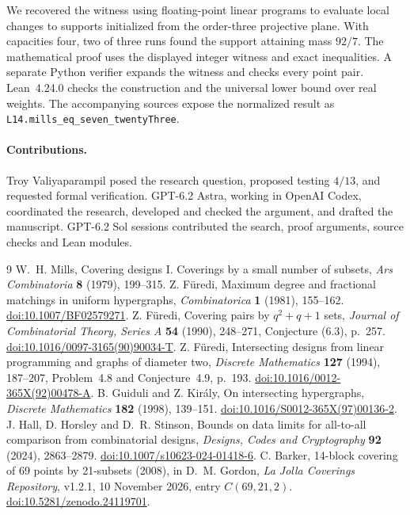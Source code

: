 \documentclass[11pt]{article}
\begin{document}
We recovered the witness using floating-point linear programs to
evaluate local changes to supports initialized from the order-three
projective plane. With capacities four, two of three runs found the
support attaining mass \(92/7\). The mathematical proof uses the
displayed integer witness and exact inequalities. A separate Python
verifier expands the witness and checks every point pair.
Lean~4.24.0 checks the construction and the universal lower bound over
real weights. The accompanying sources expose the normalized result
as \texttt{L14.mills\_eq\_seven\_twentyThree}.

\paragraph{Contributions.} Troy Valiyaparampil posed the research
question, proposed testing \(4/13\), and requested formal verification.
GPT-6.2 Astra, working in OpenAI Codex, coordinated the research,
developed and checked the argument, and drafted the manuscript. GPT-6.2
Sol sessions contributed the search, proof arguments, source checks and
Lean modules.

\begin{thebibliography}{9}\small
{} W.~H. Mills, Covering designs I. Coverings by a small
number of subsets, \emph{Ars Combinatoria} \textbf{8} (1979), 199--315.
 Z. F\"uredi, Maximum degree and fractional matchings in
uniform hypergraphs, \emph{Combinatorica} \textbf{1} (1981), 155--162.
\href{https://doi.org/10.1007/BF02579271}{doi:10.1007/BF02579271}.
 Z. F\"uredi, Covering pairs by \(q^2+q+1\) sets,
\emph{Journal of Combinatorial Theory, Series A} \textbf{54} (1990),
248--271, Conjecture (6.3), p.~257.
\href{https://doi.org/10.1016/0097-3165(90)90034-T}{doi:10.1016/0097-3165(90)90034-T}.
 Z. F\"uredi, Intersecting designs from linear
programming and graphs of diameter two, \emph{Discrete Mathematics}
\textbf{127} (1994), 187--207, Problem~4.8 and Conjecture~4.9, p.~193.
\href{https://doi.org/10.1016/0012-365X(92)00478-A}{doi:10.1016/0012-365X(92)00478-A}.
 B. Guiduli and Z. Kir\'aly, On intersecting hypergraphs,
\emph{Discrete Mathematics} \textbf{182} (1998), 139--151.
\href{https://doi.org/10.1016/S0012-365X(97)00136-2}{doi:10.1016/S0012-365X(97)00136-2}.
 J. Hall, D. Horsley and D.~R. Stinson, Bounds on data
limits for all-to-all comparison from combinatorial designs,
\emph{Designs, Codes and Cryptography} \textbf{92} (2024), 2863--2879.
\href{https://doi.org/10.1007/s10623-024-01418-6}{doi:10.1007/s10623-024-01418-6}.
 C. Barker, 14-block covering of 69 points by 21-subsets
(2008), in D.~M. Gordon, \emph{La Jolla Coverings Repository}, v1.2.1,
10 November 2026, entry \(C(69,21,2)\).
\href{https://doi.org/10.5281/zenodo.24119701}{doi:10.5281/zenodo.24119701}.
\end{thebibliography}
\end{document}
